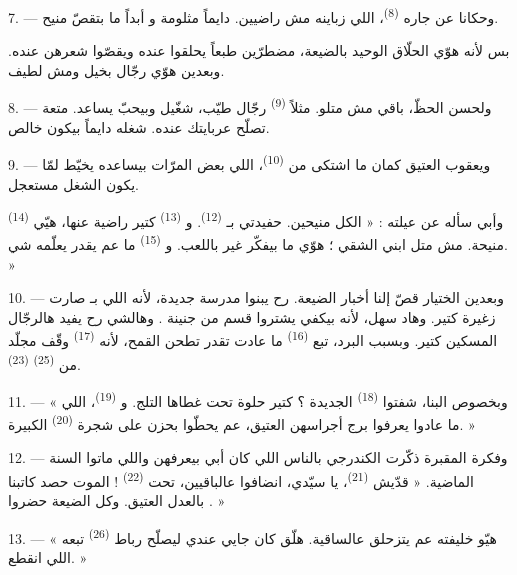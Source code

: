 7. --- وحكانا عن جاره  \textsuperscript{(8)}، اللي زباينه
مش راضيين.  دايماً مثلومة و أبداً ما
بتقصّ منيح.

بس لأنه هوّي الحلّاق الوحيد بالضيعة، مضطرّين طبعاً يحلقوا عنده ويقصّوا
شعرهن عنده. وبعدين هوّي رجّال بخيل ومش لطيف.

8. --- ولحسن الحظّ، باقي  مش متلو. مثلاً  \textsuperscript{(9)} رجّال طيّب، شغّيل وبيحبّ يساعد. متعة
تصلّح عربايتك عنده. شغله دايماً بيكون خالص.

9. --- ويعقوب العتيق كمان ما اشتكى من  \textsuperscript{(10)}،
اللي بعض المرّات بيساعده يخيّط  لمّا يكون الشغل
مستعجل.

وأبي سأله عن عيلته : « الكل منيحين. حفيدتي بـ
\textsuperscript{(12)}. و \textsuperscript{(13)} كتير راضية
عنها، هيّي  \textsuperscript{(14)} منيحة. مش متل ابني الشقي ؛
هوّي ما بيفكّر غير باللعب. و \textsuperscript{(15)} ما عم
يقدر يعلّمه شي. »

\VUsaut{3.0mm}
\VUsaut{3.0mm}

10. --- وبعدين الختيار قصّ إلنا أخبار الضيعة. رح يبنوا مدرسة جديدة،
لأنه اللي بـ صارت زغيرة كتير. وهاد سهل، لأنه بيكفي
يشتروا قسم من جنينة . وهالشي رح يفيد هالرجّال المسكين
كتير. وبسبب البرد،  تبع 
\textsuperscript{(16)} ما عادت تقدر تطحن القمح، لأنه 
\textsuperscript{(17)} وقّف مجلّد من  \textsuperscript{(25)}
 \textsuperscript{(23)}.

11. --- « وبخصوص البنا، شفتوا  \textsuperscript{(18)}
الجديدة ؟ كتير حلوة تحت غطاها التلج. و
\textsuperscript{(19)}، اللي ما عادوا يعرفوا برج أجراسهن العتيق، عم
يحطّوا بحزن على شجرة  \textsuperscript{(20)} الكبيرة. »

12. --- وفكرة المقبرة ذكّرت الكندرجي بالناس اللي كان أبي بيعرفهن واللي
ماتوا السنة الماضية. « قدّيش  \textsuperscript{(21)}، يا
سيّدي، انضافوا عالباقيين، تحت  \textsuperscript{(22)} ! الموت
حصد كاتبنا بالعدل العتيق. وكل الضيعة حضروا . »

13. --- « هيّو خليفته عم يتزحلق عالساقية. هلّق كان جايي عندي ليصلّح
رباط  \textsuperscript{(26)} تبعه اللي انقطع. »

